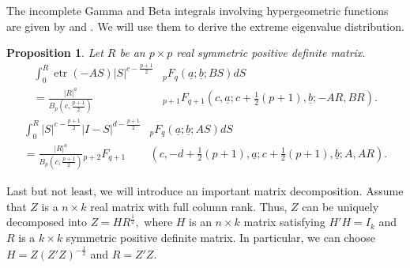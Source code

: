 \documentclass{amsart}
\newtheorem{proposition}[theorem]{Proposition}
\theoremstyle{definition}
\numberwithin{equation}{section}
\begin{document}
The incomplete Gamma and Beta integrals involving hypergeometric functions are given by \cite{constantine1963some} and \cite{Davis1979InvariantPW,Davis1981OnTC}. We will use them to derive the extreme eigenvalue distribution.
\begin{proposition}
\label{lem: davis} Let $R$ be an $p \times p$ real symmetric positive definite matrix. 
\begin{equation}
\begin{aligned}
\int_{0}^{ R} \operatorname{etr}(- A S)| S|^{c-\frac{p+1}{2}} & {}_{p}F_{q}\left(\underline{a};\underline{b}; B  S\right) d  S \\
                = \frac{| R|^a }{{B}_{p}(c,\frac{p+1}{2})}
                & {}_{p+1}F_{q+1} \left(
            c,\underline{a};c + \tfrac{1}{2}(p+1),\underline{b}; -  A  R, B  R\right).
\end{aligned}
\end{equation}
\begin{equation}
        \begin{aligned}
        \int_{0}^{ R} | S|^{c-\frac{p+1}{2}} | I -  S|^{d - \frac{p+1}{2}} & {}_{p}F_{q}\left(\underline{a};\underline{b}; A  S\right) d  S \\ = \frac{| R|^a }{{ B}_{p}\left(c,\frac{p+1}{2}\right)} {}_{p+2}F_{q+1} & \left(
            c, - d + \tfrac{1}{2}(p+1), \underline{a}; c + \tfrac{1}{2}(p+1), \underline{b};  A,  A  R\right).
    \end{aligned}
\end{equation}
\end{proposition}

Last but not least, we will introduce an important matrix decomposition. Assume that $Z$ is a $n \times k$ real matrix with full column rank. Thus, $Z$ can be uniquely decomposed into $Z = HR^{\frac{1}{2}},$ where $H$ is an $n\times k$ matrix satisfying $H'H = I_k$ and $R$ is a $k\times k$ symmetric positive definite matrix. In particular, we can choose $H = Z(Z'Z)^{-\frac{1}{2}}$ and $R = Z'Z$.
\end{document}
